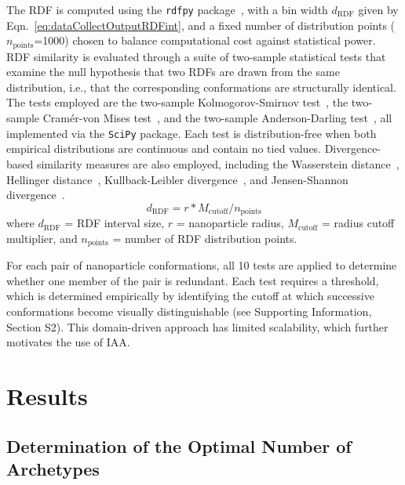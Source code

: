 \documentclass{WileyMSP-template}
\begin{document}
The RDF is computed using the \texttt{rdfpy} package~\cite{Yildirim2021rdfpy}, with a bin width $d_\mathrm{RDF}$ given by Eqn.~\ref{eq:dataCollectOutputRDFint}, and a fixed number of distribution points ($n_\mathrm{points}$=1000) chosen to balance computational cost against statistical power. RDF similarity is evaluated through a suite of two-sample statistical tests that examine the null hypothesis that two RDFs are drawn from the same distribution, i.e., that the corresponding conformations are structurally identical. The tests employed are the two-sample Kolmogorov-Smirnov test~\cite{Conover1965KStest}, the two-sample Cram\'er-von Mises test~\cite{Anderson1962CMtest}, and the two-sample Anderson-Darling test~\cite{Scholz2012ADtest}, all implemented via the \texttt{SciPy} package. Each test is distribution-free when both empirical distributions are continuous and contain no tied values. Divergence-based similarity measures are also employed, including the Wasserstein distance~\cite{Kantorovich1960KantorovichDist}, Hellinger distance~\cite{Beran1977HellingerDist}, Kullback-Leibler divergence~\cite{Kullback1951KLdiv}, and Jensen-Shannon divergence~\cite{Fuglede2004JSdiv}.
\begin{equation} \label{eq:dataCollectOutputRDFint}
d_\mathrm{RDF} = r * M_\mathrm{cutoff} / n_\mathrm{points}
\end{equation}
where $d_\mathrm{RDF}$ = RDF interval size, $r$ = nanoparticle radius, $M_\mathrm{cutoff}$ = radius cutoff multiplier, and $n_\mathrm{points}$ = number of RDF distribution points.

For each pair of nanoparticle conformations, all 10 tests are applied to determine whether one member of the pair is redundant. Each test requires a threshold, which is determined empirically by identifying the cutoff at which successive conformations become visually distinguishable (see Supporting Information, Section S2). This domain-driven approach has limited scalability, which further motivates the use of IAA.


\section{Results}
\label{sec:results}

\subsection{Determination of the Optimal Number of Archetypes}
\label{sec:optNumArch}
\end{document}
